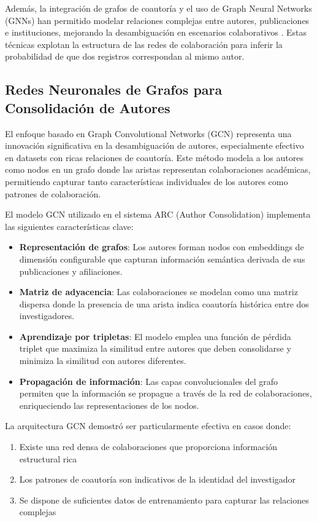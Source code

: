\documentclass{article}
\begin{document}
Además, la integración de grafos de coautoría y el uso de Graph Neural Networks (GNNs) han permitido modelar relaciones complejas entre autores, publicaciones e instituciones, mejorando la desambiguación en escenarios colaborativos \cite{Kim2018, GNN2025}. Estas técnicas explotan la estructura de las redes de colaboración para inferir la probabilidad de que dos registros correspondan al mismo autor.

\subsection{Redes Neuronales de Grafos para Consolidación de Autores}

El enfoque basado en Graph Convolutional Networks (GCN) representa una innovación significativa en la desambiguación de autores, especialmente efectivo en datasets con ricas relaciones de coautoría. Este método modela a los autores como nodos en un grafo donde las aristas representan colaboraciones académicas, permitiendo capturar tanto características individuales de los autores como patrones de colaboración.

El modelo GCN utilizado en el sistema ARC (Author Consolidation) implementa las siguientes características clave:

\begin{itemize}[leftmargin=*]
    \item \textbf{Representación de grafos}: Los autores forman nodos con embeddings de dimensión configurable que capturan información semántica derivada de sus publicaciones y afiliaciones.
    \item \textbf{Matriz de adyacencia}: Las colaboraciones se modelan como una matriz dispersa donde la presencia de una arista indica coautoría histórica entre dos investigadores.
    \item \textbf{Aprendizaje por tripletas}: El modelo emplea una función de pérdida triplet que maximiza la similitud entre autores que deben consolidarse y minimiza la similitud con autores diferentes.
    \item \textbf{Propagación de información}: Las capas convolucionales del grafo permiten que la información se propague a través de la red de colaboraciones, enriqueciendo las representaciones de los nodos.
\end{itemize}

La arquitectura GCN demostró ser particularmente efectiva en casos donde:
\begin{enumerate}[leftmargin=*]
    \item Existe una red densa de colaboraciones que proporciona información estructural rica
    \item Los patrones de coautoría son indicativos de la identidad del investigador
    \item Se dispone de suficientes datos de entrenamiento para capturar las relaciones complejas
\end{enumerate}
\end{document}
